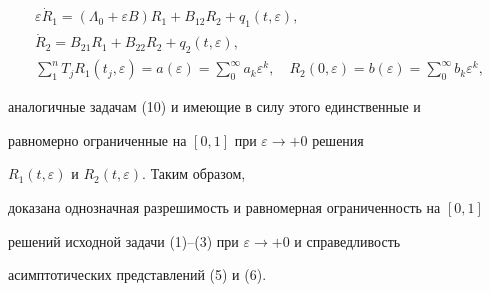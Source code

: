 \begin{gather*} 


\varepsilon\Dot R_1=(\Lambda_0+\varepsilon B)R_1+ 


B_{12}R_2+q_1(t,\varepsilon), \\ 


% 


\Dot R_2=B_{21}R_1+B_{22}R_2+q_2(t,\varepsilon), \\ 


\sum^n_1 T_jR_1(t_j,\varepsilon)=a(\varepsilon)= 


\sum^\infty_0 a_k\varepsilon^k,\quad 


R_2(0,\varepsilon)=b(\varepsilon)=\sum^\infty_0 


b_k\varepsilon^k, 


\end{gather*} 


аналогичные задачам (10) и имеющие в силу этого единственные и 


равномерно ограниченные на $[0,1]$ при $\varepsilon\to+0$ решения 


$R_1(t,\varepsilon)$ и $R_2(t,\varepsilon)$. Таким образом, 


доказана однозначная разрешимость и равномерная ограниченность на $[0,1]$ 


решений исходной задачи (1)--(3) при $\varepsilon\to+0$ и справедливость 


асимптотических представлений (5) и (6). 


 


 


